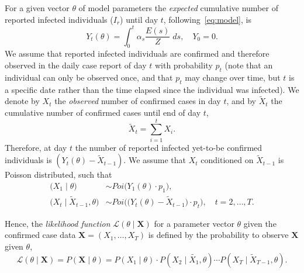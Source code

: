 \documentclass[12pt]{extarticle}
\let\vec\mathbf
\begin{document}
{For a given vector $\theta$ of model parameters the \emph{expected} cumulative number of reported infected individuals ($I_r$) until day $t$, following~\autoref{eq:model}, is
\begin{equation} \label{eq:Yt}
Y_t(\theta) = \int_{0}^{t}{\alpha_s \frac{E(s)}{Z} \; ds}, \quad Y_0 = 0.
\end{equation}
We assume that reported infected individuals are confirmed and therefore observed in the daily case report of day $t$ with probability $p_t$ (note that an individual can only be observed once, and that $p_t$ may change over time, but $t$ is a specific date rather than the time elapsed since the individual was infected).
We denote by $X_t$ the \emph{observed} number of confirmed cases in day $t$, and by $\tilde{X}_t$ the cumulative number of confirmed cases until end of day $t$,
\begin{equation} \label{eq:Xsumt}
\tilde{X}_t=\sum_{i=1}^{t}X_i.
\end{equation}
Therefore, at day $t$ the number of reported infected yet-to-be confirmed individuals is
$(Y_t(\theta) - \tilde{X}_{t-1})$.
We assume that $X_t$ conditioned on $\tilde{X}_{t-1}$ is Poisson distributed, such that
\begin{equation} \label{eq:Xt} \begin{aligned}
\Big(X_1 \mid \theta \Big) & \sim \mathit{Poi}\big( Y_1(\theta) \cdot p_1 \big), \\
\Big(X_t \mid \tilde{X}_{t-1}, \theta \Big) & \sim 
\mathit{Poi}\Big( \big(Y_t(\theta) - \tilde{X}_{t-1}\big) \cdot p_t \Big), \quad t=2,\ldots,T.
\end{aligned}\end{equation}

Hence, the \emph{likelihood function} $\mathcal{L}(\theta \mid \vec{X})$ for a parameter vector $\theta$ given the confirmed case data $\vec{X} = (X_1, \ldots, X_T)$ is defined by the probability to observe  $\vec{X}$ given $\theta$,
\begin{equation} \label{eq:likelihood}
\mathcal{L}(\theta \mid \vec{X}) = 
P(\vec{X} \mid \theta) = 
P(X_1 \mid \theta) \cdot P(X_2 \mid \tilde{X_1}, \theta) \cdots P(X_T \mid \tilde{X}_{T-1}, \theta).
\end{equation}



}
\end{document}

